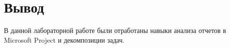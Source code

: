 \chapter*{Вывод}

В данной лабораторной работе были отработаны навыки анализа отчетов в Microsoft Project и декомпозиции задач. 
